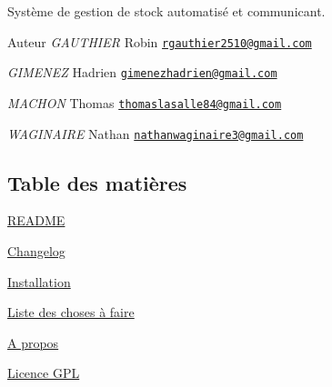 Système de gestion de stock automatisé et communicant.

\begin{DoxyAuthor}{Auteur}
{\itshape G\+A\+U\+T\+H\+I\+ER} Robin \href{mailto:rgauthier2510@gmail.com}{\tt rgauthier2510@gmail.\+com}

{\itshape G\+I\+M\+E\+N\+EZ} Hadrien \href{mailto:gimenezhadrien@gmail.com}{\tt gimenezhadrien@gmail.\+com}

{\itshape M\+A\+C\+H\+ON} Thomas \href{mailto:thomaslasalle84@gmail.com}{\tt thomaslasalle84@gmail.\+com}

{\itshape W\+A\+G\+I\+N\+A\+I\+RE} Nathan \href{mailto:nathanwaginaire3@gmail.com}{\tt nathanwaginaire3@gmail.\+com}
\end{DoxyAuthor}
\hypertarget{index_section_tdm}{}\subsection{Table des matières}\label{index_section_tdm}

\begin{DoxyItemize}
\item \hyperlink{page__r_e_a_d_m_e}{R\+E\+A\+D\+ME}
\item \hyperlink{page_changelog}{Changelog}
\item \hyperlink{page_install}{Installation}
\item \hyperlink{todo}{Liste des choses à faire}
\item \hyperlink{page_about}{A propos}
\item \hyperlink{page_licence}{Licence G\+PL} 
\end{DoxyItemize}